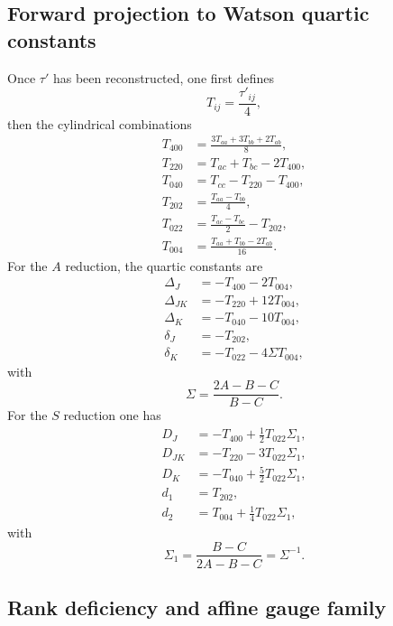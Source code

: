 \subsection{Forward projection to Watson quartic constants}

Once $\tau'$ has been reconstructed, one first defines
\begin{equation}
T_{ij} = \frac{\tau'_{ij}}{4},
\end{equation}
then the cylindrical combinations
\begin{align}
T_{400} &= \frac{3T_{aa}+3T_{bb}+2T_{ab}}{8}, \\
T_{220} &= T_{ac}+T_{bc}-2T_{400}, \\
T_{040} &= T_{cc}-T_{220}-T_{400}, \\
T_{202} &= \frac{T_{aa}-T_{bb}}{4}, \\
T_{022} &= \frac{T_{ac}-T_{bc}}{2}-T_{202}, \\
T_{004} &= \frac{T_{aa}+T_{bb}-2T_{ab}}{16}.
\end{align}
For the $A$ reduction, the quartic constants are
\begin{align}
\Delta_J   &= -T_{400}-2T_{004}, \\
\Delta_{JK}&= -T_{220}+12T_{004}, \\
\Delta_K   &= -T_{040}-10T_{004}, \\
\delta_J   &= -T_{202}, \\
\delta_K   &= -T_{022}-4\Sigma T_{004},
\end{align}
with
\begin{equation}
\Sigma = \frac{2A-B-C}{B-C}.
\end{equation}
For the $S$ reduction one has
\begin{align}
D_J   &= -T_{400}+\frac12 T_{022}\Sigma_1, \\
D_{JK}&= -T_{220}-3T_{022}\Sigma_1, \\
D_K   &= -T_{040}+\frac52 T_{022}\Sigma_1, \\
d_1   &= T_{202}, \\
d_2   &= T_{004}+\frac14 T_{022}\Sigma_1,
\end{align}
with
\begin{equation}
\Sigma_1 = \frac{B-C}{2A-B-C} = \Sigma^{-1}.
\end{equation}

\subsection{Rank deficiency and affine gauge family}

